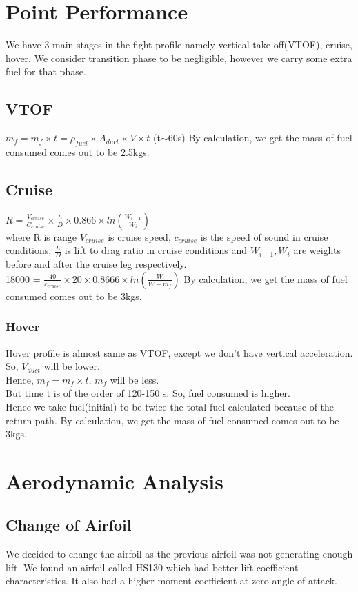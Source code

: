 \section{Point Performance}
We have 3 main stages in the fight profile namely vertical take-off(VTOF), cruise, hover. We consider transition phase to be negligible, however we carry some extra fuel for that phase. 
\subsection{VTOF}
$m_f = \dot{m_f}\times t = \rho_{fuel}\times A_{duct}\times V \times t$ (t$\sim$60s)
By calculation, we get the mass of fuel consumed comes out to be 2.5kgs.
\subsection{Cruise}
$R = \frac{V_{cruise}}{C_{cruise}}\times\frac{L}{D}\times0.866 \times ln(\frac{W_{i-1}}{W_i})$ \\
where R is range $V_{cruise}$ is cruise speed, $c_{cruise}$ is the speed of sound in cruise conditions, $\frac{L}{D}$ is lift to drag ratio in cruise conditions and $W_{i-1}, W_i$ are weights before and after the cruise leg respectively.\\
18000 = $\frac{40}{c_{cruise}}\times20\times0.8666\times ln(\frac{W}{W - m_f})$
By calculation, we get the mass of fuel consumed comes out to be 3kgs.
\subsubsection{Hover}
Hover profile is almost same as VTOF, except we don't have vertical acceleration.\\
So, $V_{duct}$ will be lower.\\
Hence, $m_f = \dot{m_f}\times t$, $\dot{m_f}$ will be less.\\
But time t is of the order of 120-150 s. So, fuel consumed is higher.\\
Hence we take fuel(initial) to be twice the total fuel calculated because of the return path.
By calculation, we get the mass of fuel consumed comes out to be 3kgs.
\section{Aerodynamic Analysis}
\subsection{Change of Airfoil}
We decided to change the airfoil as the previous airfoil was not generating enough lift. We found an airfoil called HS130 which had better lift coefficient characteristics. It also had a higher moment coefficient at zero angle of attack.\\
